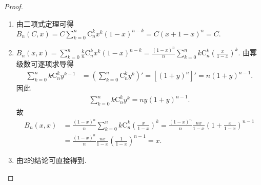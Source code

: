 \documentclass[../../main.tex]{subfiles}
\begin{document}
\begin{proof}
\begin{enumerate}
\item 由二项式定理可得$B_n(C,x)=C\sum_{k=0}^n{\mathrm{C}_{n}^{k}x^k\left( 1-x \right) ^{n-k}}=C\left( x+1-x \right) ^n=C.$

\item $B_n(x,x)=\sum_{k=0}^n{\frac{k}{n}\mathrm{C}_{n}^{k}x^k\left( 1-x \right) ^{n-k}}=\frac{\left( 1-x \right) ^n}{n}\sum_{k=0}^n{k\mathrm{C}_{n}^{k}\left( \frac{x}{1-x} \right) ^k}$.
由幂级数可逐项求导得
\begin{align*}
\sum_{k=0}^n{k\mathrm{C}_{n}^{k}y^{k-1}}&=\left( \sum_{k=0}^n{\mathrm{C}_{n}^{k}y^k} \right) ' =\left[ \left( 1+y \right) ^n \right] ' =n\left( 1+y \right) ^{n-1}.
\end{align*}
因此
\begin{align*}
\sum_{k=0}^n{k\mathrm{C}_{n}^{k}y^k}=ny\left( 1+y \right) ^{n-1}.
\end{align*}
故
\begin{align*}
B_n(x,x)&=\frac{\left( 1-x \right) ^n}{n}\sum_{k=0}^n{k\mathrm{C}_{n}^{k}\left( \frac{x}{1-x} \right) ^k}=\frac{\left( 1-x \right) ^n}{n}\frac{nx}{1-x}\left( 1+\frac{x}{1-x} \right) ^{n-1}\\
&=\frac{\left( 1-x \right) ^n}{n}\frac{nx}{1-x}\left( \frac{1}{1-x} \right) ^{n-1}=x.
\end{align*}

\item 由2的结论可直接得到.


\end{enumerate}
\end{proof}
\end{document}
